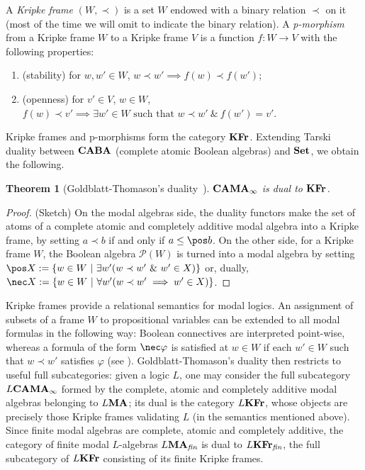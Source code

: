 \documentclass{article}
\newtheorem{thm}{Theorem}
\theoremstyle{definition}
\newcommand{\KFr}{\textup{\textbf{KFr}}}
\newcommand{\PreO}{\textup{\textbf{PreO}}}
\newcommand{\Pos}{\textup{\textbf{Pos}}}
\newcommand{\MA}{\textup{\textbf{MA}}}
\newcommand{\CAMA}{\textup{\textbf{CAMA}}}
\newcommand{\CABA}{\textup{\textbf{CABA}}}
\newcommand{\fin}{\textit{fin}}
\newcommand{\Set}{\textup{\textbf{Set}}}
\begin{document}
A \emph{Kripke frame} $(W,\prec)$ is a set $W$ endowed with a binary relation $\prec$ on it (most of the time we will omit to indicate the binary relation). A \emph{p-morphism} from a Kripke frame $W$ to a Kripke frame $V$ is a function $f \colon W \longrightarrow V$ with the following properties:
\begin{enumerate}
    \item (stability) for $w, w' \in W$, $w \prec w' \implies f(w) \prec f(w')$;
    \item (openness) for $v' \in V$, $w \in W$, $f(w) \prec v' \implies \exists w' \in W \text{ such that } w \prec w' ~\&~ f(w') = v'$.
\end{enumerate}
Kripke frames and p-morphisms form the category $\KFr$.
%
%
Extending Tarski duality between $\CABA$ (complete atomic Boolean algebras) and $\Set$, we obtain the following.
\begin{thm}[Goldblatt-Thomason's duality~\cite{thomason}]\label{thm:duality}
$\CAMA_\infty$  is dual to $\KFr$.
\end{thm}
\begin{proof}(Sketch)
On the modal algebras side, the duality functors make the set of atoms of a complete atomic and completely additive modal algebra into a Kripke frame, by setting $a \prec b$ if and only if $a \leq \pos b$. On the other side, for a Kripke frame $W$, the Boolean algebra $\mathcal{P}(W)$ is turned into a modal algebra by setting $\pos X := \{w \in W\ \vert\ \exists w' (w \prec w' ~\&~ w' \in X)\}$ or, dually, $\nec X := \{w \in W\ \vert\ \forall w' (w \prec w' \implies w' \in X)\}$.
\end{proof}
Kripke frames provide a relational semantics for modal logics. An assignment of subsets of a frame $W$ to propositional variables can be extended to all modal formulas in the following way: Boolean connectives are interpreted point-wise, whereas a formula of the form $\nec \varphi$ is satisfied at $w \in W$ if each $w' \in W$ such that $w \prec w'$ satisfies $\varphi$ (see \cite{Modal}). %
Goldblatt-Thomason's duality then restricts to useful full subcategories: given a logic $L$, one may consider the full subcategory $L\CAMA_\infty$ formed by the complete, atomic and completely additive modal algebras belonging to $L\MA$; its dual is the category $L\KFr$, whose objects are precisely those Kripke frames validating $L$ (in the semantics mentioned above). %
Since finite modal algebras are complete, atomic and completely additive, the category of finite modal $L$-algebras $L\MA_\fin$ is dual to $L\KFr_\fin$, the full subcategory of $L\KFr$ consisting of its finite Kripke frames.
\end{document}
